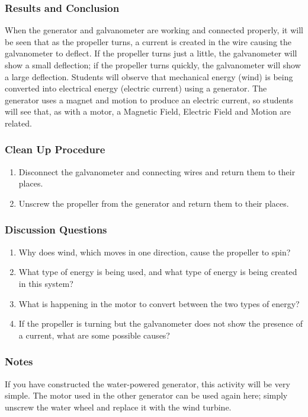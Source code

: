 \subsubsection*{Results and Conclusion}
When the generator and galvanometer are working and connected properly, it will be seen that as the propeller turns, a current is created in the wire causing the galvanometer to deflect. If the propeller turns just a little, the galvanometer will show a small deflection; if the propeller turns quickly, the galvanometer will show a large deflection.  
Students will observe that mechanical energy (wind) is being converted into electrical energy (electric current) using a generator. The generator uses a magnet and motion to produce an electric current, so students will see that, as with a motor, a Magnetic Field, Electric Field and Motion are related.  

\subsubsection*{Clean Up Procedure}
\begin{enumerate}
\item{Disconnect the galvanometer and connecting wires and return them to their places.} 
\item{Unscrew the propeller from the generator and return them to their places.} 
\end{enumerate}

\subsubsection*{Discussion Questions}
\begin{enumerate}
\item{Why does wind, which moves in one direction, cause the propeller to spin?}
\item{What type of energy is being used, and what type of energy is being created in this system?}
\item{What is happening in the motor to convert between the two types of energy?}
\item{If the propeller is turning but the galvanometer does not show the presence of a current, what are some possible causes?}
\end{enumerate}

\subsubsection*{Notes}
If you have constructed the water-powered generator, this activity will be very simple.  The motor used in the other generator can be used again here; simply unscrew the water wheel and replace it with the wind turbine.

